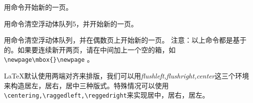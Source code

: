用命令开始新的一页。

用命令清空浮动体队列5，并开始新的一页。

用命令清空浮动体队列，并在偶数页上开始新的一页。
注意：以上命令都是基于的。如果要连续新开两页，请在中间加上一个空的箱，如\verb|\newpage\mbox{}\newpage| 。

\LaTeX 默认使用两端对齐来排版，我们可以用\emph{flushleft,flushright,center}这三个环境来构造居左，居右，居中三种版式。特殊情况可以使用\verb|\centering,\raggedleft,\reggedright|来实现居中，居右，居左。







